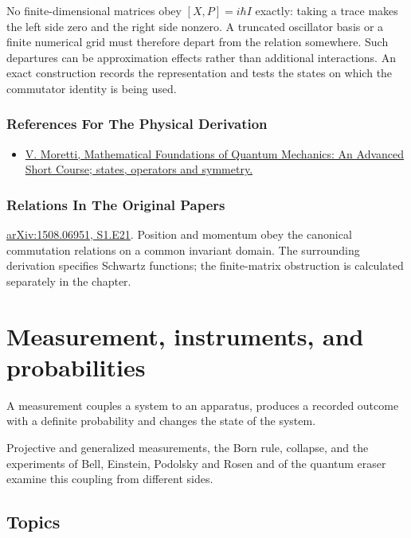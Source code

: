 \documentclass[11pt,oneside]{book}
\begin{document}
No finite-dimensional matrices obey \([X,P]=i\hbar I\) exactly: taking a trace makes the left side zero and the right side nonzero. A truncated oscillator basis or a finite numerical grid must therefore depart from the relation somewhere. Such departures can be approximation effects rather than additional interactions. An exact construction records the representation and tests the states on which the commutator identity is being used.

\subsection*{References For The Physical Derivation}
\begin{itemize}
\item \href{https://arxiv.org/abs/1508.06951}{V. Moretti, Mathematical Foundations of Quantum Mechanics: An Advanced Short Course; states, operators and symmetry.}
\end{itemize}

\subsection*{Relations In The Original Papers}

\href{https://arxiv.org/html/1508.06951#S1.E21}{arXiv:1508.06951, S1.E21}. Position and momentum obey the canonical commutation relations on a common invariant domain. The surrounding derivation specifies Schwartz functions; the finite-matrix obstruction is calculated separately in the chapter.



\chapter{Measurement, instruments, and probabilities}

\begin{claimbox}

A measurement couples a system to an apparatus, produces a recorded outcome with a definite probability and changes the state of the system.

\end{claimbox}

Projective and generalized measurements, the Born rule, collapse, and the experiments of Bell, Einstein, Podolsky and Rosen and of the quantum eraser examine this coupling from different sides.

\section*{Topics}
\end{document}
